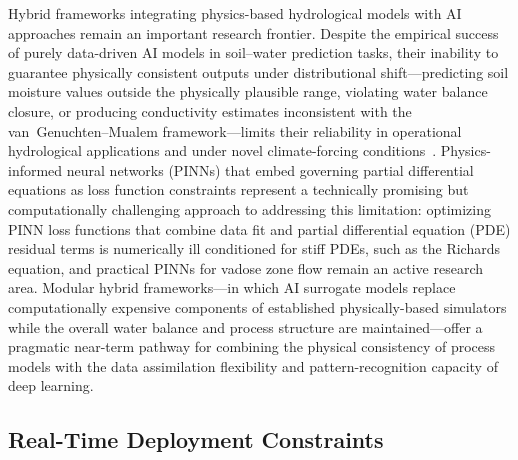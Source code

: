 \documentclass[land,review,accept,pdftex,oneauthor]{Definitions/mdpi}
\begin{document}
Hybrid frameworks integrating physics-based hydrological models with AI approaches remain an important research frontier. Despite the empirical success of purely data-driven AI models in soil--water prediction tasks, their inability to guarantee physically consistent outputs under distributional shift---predicting soil moisture values outside the physically plausible range, violating water balance closure, or producing conductivity estimates inconsistent with the van~Genuchten--Mualem framework---limits their reliability in operational hydrological applications and under novel climate-forcing conditions~\citep{willard2022integrating}. Physics-informed neural networks (PINNs) that embed governing partial differential equations as loss function constraints represent a technically promising but computationally challenging approach to addressing this limitation: optimizing PINN loss functions that combine data fit and {partial differential equation (}PDE{)} residual terms is numerically ill conditioned for stiff PDEs, such as the Richards equation, and practical PINNs for vadose zone flow remain an active research area. Modular hybrid frameworks---in which AI surrogate models replace computationally expensive components of established physically-based simulators while the overall water balance and process structure are maintained---offer a pragmatic near-term pathway for combining the physical consistency of process models with the data assimilation flexibility and pattern-recognition capacity of deep learning.

\subsection{Real-Time Deployment Constraints}
\end{document}
